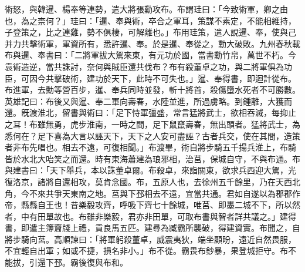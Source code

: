 \begin{pinyinscope}
術怒，與韓暹、楊奉等連勢，遣大將張勳攻布。布謂珪曰：「今致術軍，卿之由也，為之柰何？」珪曰：「暹、奉與術，卒合之軍耳，策謀不素定，不能相維持，子登策之，比之連雞，勢不俱棲，可解離也。」布用珪策，遣人說暹、奉，使與己并力共擊術軍，軍資所有，悉許暹、奉。於是暹、奉從之，勳大破敗。九州春秋載布與暹、奉書曰：「二將軍拔大駕來東，有元功於國，當書勳竹帛，萬世不朽。今袁術造逆，當共誅討，奈何與賊臣還共伐布？布有殺董卓之功，與二將軍俱為功臣，可因今共擊破術，建功於天下，此時不可失也。」暹、奉得書，即迴計從布。布進軍，去勳等營百步，暹、奉兵同時並發，斬十將首，殺傷墮水死者不可勝數。英雄記曰：布後又與暹、奉二軍向壽春，水陸並進，所過虜略。到鍾離，大獲而還。旣渡淮北，留書與術曰：「足下恃軍彊盛，常言猛將武士，欲相吞滅，每抑止之耳！布雖無勇，虎步淮南，一時之間，足下鼠竄壽春，無出頭者。猛將武士，為悉何在？足下喜為大言以誣天下，天下之人安可盡誣？古者兵交，使在其間，造策者非布先唱也。相去不遠，可復相聞。」布渡畢，術自將步騎五千揚兵淮上，布騎皆於水北大咍笑之而還。時有東海蕭建為琅邪相，治莒，保城自守，不與布通。布與建書曰：「天下舉兵，本以誅董卓爾。布殺卓，來詣關東，欲求兵西迎大駕，光復洛京，諸將自還相攻，莫肯念國。布，五原人也，去徐州五千餘里，乃在天西北角，今不來共爭天東南之地。莒與下邳相去不遠，宜當共通。君如自遂以為郡郡作帝，縣縣自王也！昔樂毅攻齊，呼吸下齊七十餘城，唯莒、即墨二城不下，所以然者，中有田單故也。布雖非樂毅，君亦非田單，可取布書與智者詳共議之。」建得書，即遣主簿齎牋上禮，貢良馬五匹。建尋為臧霸所襲破，得建資實。布聞之，自將步騎向莒。高順諫曰：「將軍躬殺董卓，威震夷狄，端坐顧盼，遠近自然畏服，不宜輕自出軍；如或不捷，損名非小。」布不從。霸畏布鈔暴，果登城拒守。布不能拔，引還下邳。霸後復與布和。


\end{pinyinscope}
